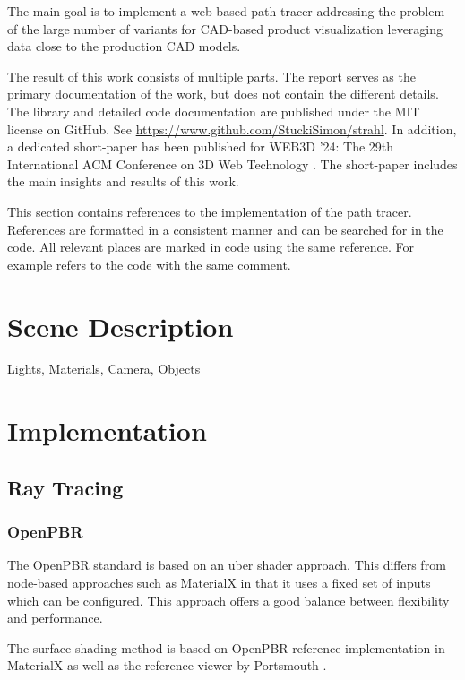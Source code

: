 
The main goal is to implement a web-based path tracer addressing the problem of the large number of variants for CAD-based product visualization leveraging data close to the production CAD models.

The result of this work consists of multiple parts. The report serves as the primary documentation of the work, but does not contain the different details. The library and detailed code documentation are published under the MIT license on GitHub. See \url{https://www.github.com/StuckiSimon/strahl}. In addition, a dedicated short-paper has been published for WEB3D '24: The 29th International ACM Conference on 3D Web Technology \cite{ownShortPaper}. The short-paper includes the main insights and results of this work.

This section contains references to the implementation of the path tracer. References are formatted in a consistent manner and can be searched for in the code. All relevant places are marked in code using the same reference. For example  refers to the code with the same comment.

\section{Scene Description}
Lights, Materials, Camera, Objects
\section{Implementation}
\subsection{Ray Tracing}

\subsubsection{OpenPBR}

The \gls{OpenPBR} standard is based on an \gls{uber shader} approach. This differs from node-based approaches such as \gls{MaterialX} in that it uses a fixed set of inputs which can be configured. This approach offers a good balance between flexibility and performance.

The surface shading method is based on \gls{OpenPBR} reference implementation in \gls{MaterialX} as well as the reference viewer by Portsmouth \cite{openPbrViewer}.

